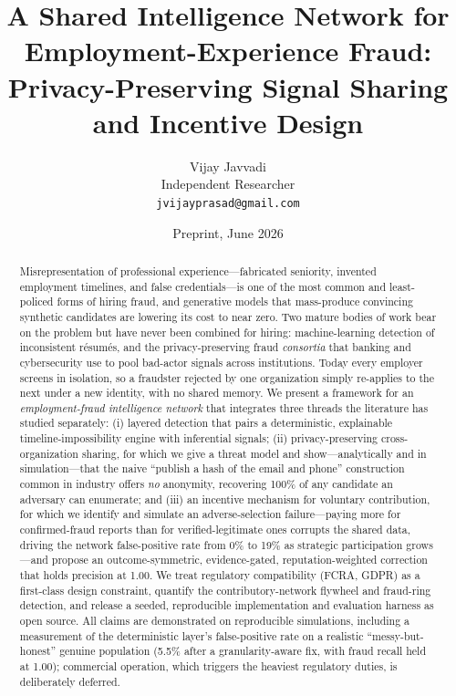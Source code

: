 \documentclass[11pt]{article}
\title{\textbf{A Shared Intelligence Network for Employment-Experience Fraud:\\
Privacy-Preserving Signal Sharing and Incentive Design}}
\author{Vijay Javvadi\\
\small Independent Researcher\\
\small \texttt{jvijayprasad@gmail.com}}
\date{Preprint, June 2026}
\begin{document}
\maketitle

\begin{abstract}
\noindent Misrepresentation of professional experience---fabricated seniority,
invented employment timelines, and false credentials---is one of the most common
and least-policed forms of hiring fraud, and generative models that mass-produce
convincing synthetic candidates are lowering its cost to near zero. Two mature
bodies of work bear on the problem but have never been combined for hiring:
machine-learning detection of inconsistent r\'esum\'es, and the
privacy-preserving fraud \emph{consortia} that banking and cybersecurity use to
pool bad-actor signals across institutions. Today every employer screens in
isolation, so a fraudster rejected by one organization simply re-applies to the
next under a new identity, with no shared memory. We present a framework for an
\emph{employment-fraud intelligence network} that integrates three threads the
literature has studied separately: (i) layered detection that pairs a
deterministic, explainable timeline-impossibility engine with inferential
signals; (ii) privacy-preserving cross-organization sharing, for which we give a
threat model and show---analytically and in simulation---that the naive
``publish a hash of the email and phone'' construction common in industry offers
\emph{no} anonymity, recovering 100\% of any candidate an adversary can
enumerate; and (iii) an incentive mechanism for voluntary contribution, for which
we identify and simulate an adverse-selection failure---paying more for
confirmed-fraud reports than for verified-legitimate ones corrupts the shared
data, driving the network false-positive rate from 0\% to 19\% as strategic
participation grows---and propose an outcome-symmetric, evidence-gated,
reputation-weighted correction that holds precision at 1.00. We treat regulatory
compatibility (FCRA, GDPR) as a first-class design constraint, quantify the
contributory-network flywheel and fraud-ring detection, and release a seeded,
reproducible implementation and evaluation harness as open source. All claims are
demonstrated on reproducible simulations, including a measurement of the
deterministic layer's false-positive rate on a realistic ``messy-but-honest''
genuine population (5.5\% after a granularity-aware fix, with fraud recall held at
1.00); commercial operation, which triggers the heaviest regulatory duties, is
deliberately deferred.
\end{abstract}
\end{document}

